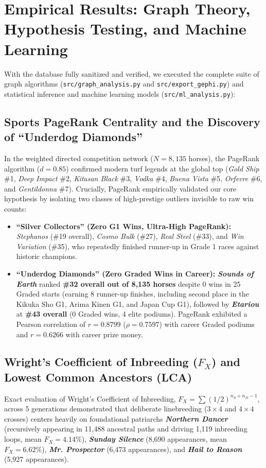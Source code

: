 \documentclass[12pt,a4paper]{article}
\begin{document}
\section{Empirical Results: Graph Theory, Hypothesis Testing, and Machine Learning}
With the database fully sanitized and verified, we executed the complete suite of graph algorithms (\texttt{src/graph\_analysis.py} and \texttt{src/export\_gephi.py}) and statistical inference and machine learning models (\texttt{src/ml\_analysis.py}):

\subsection{Sports PageRank Centrality and the Discovery of ``Underdog Diamonds''}
In the weighted directed competition network ($N = 8,135$ horses), the PageRank algorithm ($d = 0.85$) confirmed modern turf legends at the global top (\textit{Gold Ship} \#1, \textit{Deep Impact} \#2, \textit{Kitasan Black} \#3, \textit{Vodka} \#4, \textit{Buena Vista} \#5, \textit{Orfevre} \#6, and \textit{Gentildonna} \#7). Crucially, PageRank empirically validated our core hypothesis by isolating two classes of high-prestige outliers invisible to raw win counts:
\begin{itemize}
    \item \textbf{``Silver Collectors'' (Zero G1 Wins, Ultra-High PageRank):} \textit{Stephanos} (\#19 overall), \textit{Cosmo Bulk} (\#27), \textit{Real Steel} (\#33), and \textit{Win Variation} (\#35), who repeatedly finished runner-up in Grade 1 races against historic champions.
    \item \textbf{``Underdog Diamonds'' (Zero Graded Wins in Career):} \textbf{\textit{Sounds of Earth}} ranked \textbf{\#32 overall out of 8,135 horses} despite 0 wins in 25 Graded starts (earning 8 runner-up finishes, including second place in the Kikuka Sho G1, Arima Kinen G1, and Japan Cup G1), followed by \textbf{\textit{Etariou}} at \textbf{\#43 overall} (0 Graded wins, 4 elite podiums). PageRank exhibited a Pearson correlation of $r = 0.8799$ ($\rho = 0.7597$) with career Graded podiums and $r = 0.6266$ with career prize money.
\end{itemize}

\subsection{Wright's Coefficient of Inbreeding ($F_X$) and Lowest Common Ancestors (LCA)}
Exact evaluation of Wright's Coefficient of Inbreeding, $F_X = \sum (1/2)^{n_S + n_D - 1}$, across 5 generations demonstrated that deliberate linebreeding ($3\times 4$ and $4\times 4$ crosses) centers heavily on foundational patriarchs \textbf{\textit{Northern Dancer}} (recursively appearing in 11,488 ancestral paths and driving 1,119 inbreeding loops, mean $F_X = 4.14\%$), \textbf{\textit{Sunday Silence}} (8,690 appearances, mean $F_X = 6.62\%$), \textbf{\textit{Mr. Prospector}} (6,473 appearances), and \textbf{\textit{Hail to Reason}} (5,927 appearances).
\end{document}
